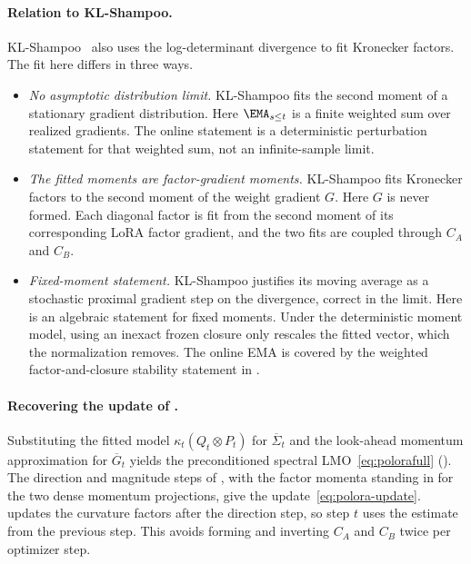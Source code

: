 \paragraph{Relation to KL-Shampoo.}
KL-Shampoo~\cite{klshampoo} also uses the log-determinant divergence to
fit Kronecker factors. The fit here differs in three ways.
\begin{itemize}[leftmargin=1.5em,itemsep=1pt,topsep=2pt]
  \item \emph{No asymptotic distribution limit.} KL-Shampoo fits the second
  moment of a stationary gradient distribution. Here $\EMA_{s\le t}$ is a
  finite weighted sum over realized gradients. The online statement is a
  deterministic perturbation statement for that weighted sum, not an
  infinite-sample limit.
  \item \emph{The fitted moments are factor-gradient moments.} KL-Shampoo
  fits Kronecker factors to the second moment of the weight gradient $G$.
  Here $G$ is never formed. Each diagonal factor is fit from the second
  moment of its corresponding LoRA factor gradient, and the two fits are
  coupled through $C_A$ and $C_B$.
  \item \emph{Fixed-moment statement.} KL-Shampoo
  justifies its moving average as a stochastic proximal gradient step on the
  divergence, correct in the limit. Here  is an
  algebraic statement for fixed moments. Under the deterministic moment model,
  using an inexact frozen closure only rescales the fitted vector, which the
  normalization removes. The online EMA is covered by the weighted
  factor-and-closure stability statement in .
\end{itemize}

\paragraph{Recovering the update of .}
Substituting the fitted model $\kappa_t(Q_t\otimes P_t)$ for
$\overline\Sigma_t$ and the look-ahead momentum approximation for
$\overline G_t$ yields the preconditioned spectral
LMO~\eqref{eq:polorafull} (). The
direction and magnitude steps of , with the
factor momenta standing in for the two dense momentum projections, give
the update~\eqref{eq:polora-update}.  updates the
curvature factors after the direction step, so step $t$ uses the estimate
from the previous step. This avoids forming and inverting $C_A$ and
$C_B$ twice per optimizer step.

